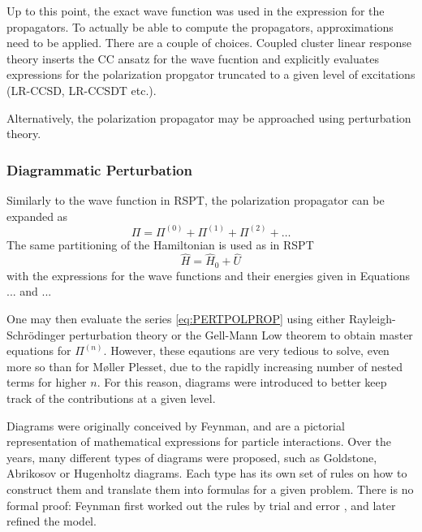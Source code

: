 Up to this point, the exact wave function was used in the expression for the propagators. To actually be able to compute the propagators, approximations need to be applied. There are a couple of choices. Coupled cluster linear response theory inserts the CC ansatz for the wave fucntion and explicitly evaluates expressions for the polarization propgator truncated to a given level of excitations (LR-CCSD, LR-CCSDT etc.).

Alternatively, the polarization propagator may be approached using perturbation theory.

\subsubsection{Diagrammatic Perturbation}

Similarly to the wave function in RSPT, the polarization propagator can be expanded as
\begin{equation}
\Pi = \Pi^{(0)} + \Pi^({1}) + \Pi^{(2)} + \ldots
\label{eq:PERTPOLPROP}
\end{equation}
\noindent The same partitioning of the Hamiltonian is used as in RSPT
\begin{equation}
\hat{H} = \hat{H}_0 + \hat{U}
\end{equation}
\noindent with the expressions for the wave functions and their energies given in Equations ... and ... 

One may then evaluate the series \ref{eq:PERTPOLPROP} using either Rayleigh-Schrödinger perturbation theory or the Gell-Mann Low theorem \cite{Sch2018} to obtain master equations for $\Pi^{(n)}$. However, these eqautions are very tedious to solve, even more so than for M{\o}ller Plesset, due to the rapidly increasing number of nested terms for higher $n$. For this reason, diagrams were introduced to better keep track of the contributions at a given level. 

Diagrams were originally conceived by Feynman, and are a pictorial representation of mathematical expressions for particle interactions. Over the years, many different types of diagrams were proposed, such as Goldstone, Abrikosov or Hugenholtz diagrams. Each type has its own set of rules on how to construct them and translate them into formulas for a given problem. There is no formal proof: Feynman first worked out the rules by trial and error \cite{Fey1966}, and later refined the model.


